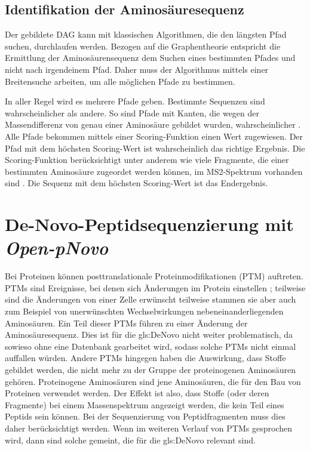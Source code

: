 \documentclass[a4paper, 12pt]{article}
\newcommand{\dashAndSpace}{\textendash \space}
\begin{document}
\subsection{Identifikation der Aminosäuresequenz}
Der gebildete DAG kann mit klassischen Algorithmen, die den längsten Pfad suchen, durchlaufen werden. Bezogen auf die Graphentheorie entspricht die Ermittlung der Aminosäurensequenz dem Suchen eines bestimmten Pfades \dashAndSpace und nicht nach irgendeinem Pfad. Daher muss der Algorithmus mittels einer Breitensuche arbeiten, um alle möglichen Pfade zu bestimmen.

In aller Regel wird es mehrere Pfade geben. Bestimmte Sequenzen sind wahrscheinlicher als andere. So sind Pfade mit Kanten, die wegen der Massendifferenz von genau einer Aminosäure gebildet wurden, wahrscheinlicher \cite{pNovoPlus}. Alle Pfade bekommen mittels einer Scoring-Funktion einen Wert zugewiesen. Der Pfad mit dem höchsten Scoring-Wert ist wahrscheinlich das richtige Ergebnis. Die Scoring-Funktion berücksichtigt unter anderem wie viele Fragmente, die einer bestimmten Aminosäure zugeordet werden können, im MS2-Spektrum vorhanden sind \cite{pNovo}. Die Sequenz mit dem höchsten Scoring-Wert ist das Endergebnis.

\section{De-Novo-Peptidsequenzierung mit \emph{Open-pNovo}}\label{s:OpenpNovoSeq}
Bei Proteinen können posttranslationale Proteinmodifikationen (PTM) auftreten. PTMs sind Ereignisse, bei denen sich Änderungen im Protein einstellen \cite{Mann2003}; teilweise sind die Änderungen von einer Zelle erwünscht \dashAndSpace teilweise stammen sie aber auch zum Beispiel von unerwünschten Wechselwirkungen nebeneinanderliegenden Aminosäuren. Ein Teil dieser PTMs führen zu einer Änderung der Aminosäuresequenz. Dies ist für die \gls{gls:DeNovo} nicht weiter problematisch, da sowieso ohne eine Datenbank gearbeitet wird, sodass solche PTMs nicht einmal auffallen würden. Andere PTMs hingegen haben die Auswirkung, dass Stoffe gebildet werden, die nicht mehr zu der Gruppe der proteinogenen Aminosäuren gehören. Proteinogene Aminosäuren sind jene Aminosäuren, die für den Bau von Proteinen verwendet werden. Der Effekt ist also, dass Stoffe (oder deren Fragmente) bei einem Massenspektrum angezeigt werden, die kein Teil eines Peptids sein können. Bei der Sequenzierung von Peptidfragmenten muss dies daher berücksichtigt werden.
Wenn im weiteren Verlauf von PTMs gesprochen wird, dann sind solche gemeint, die für die \gls{gls:DeNovo} relevant sind.
\end{document}
